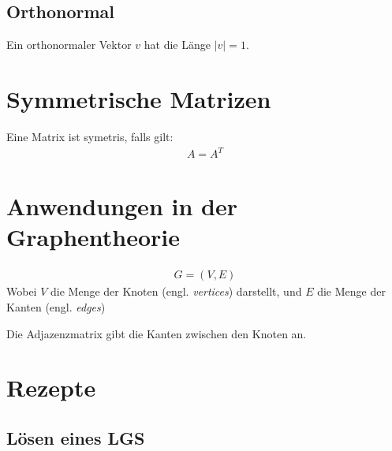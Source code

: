 \documentclass{scrartcl}
\begin{document}
\subsection{Orthonormal}

\begin{Def}
    Ein orthonormaler Vektor $v$ hat die Länge $|v| = 1$.
\end{Def}

\newpage
\section{Symmetrische Matrizen}

\begin{Def}
Eine Matrix ist symetris, falls gilt:
\begin{align*}
A = A^T
\end{align*}
\end{Def}

\newpage
\section{Anwendungen in der Graphentheorie}

\begin{Def}
    \begin{align*}
        G = (V, E)
    \end{align*}
    Wobei $V$ die Menge der Knoten (engl. \textit{vertices}) darstellt, und $E$ die Menge der Kanten (engl. \textit{edges})
\end{Def}

\begin{Def}[Adjazenzmatrix]
    Die Adjazenzmatrix gibt die Kanten zwischen den Knoten an.
\end{Def}

\newpage
\section{Rezepte}
\label{Rezepte}

\subsection{Lösen eines LGS}
\end{document}

